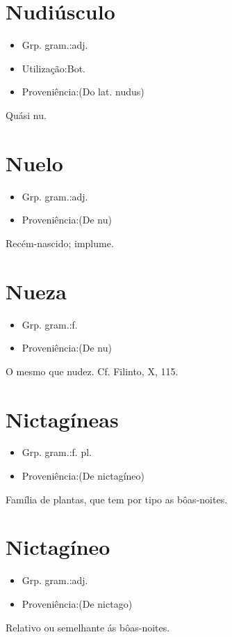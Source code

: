 \section{Nudiúsculo}
\begin{itemize}
\item {Grp. gram.:adj.}
\end{itemize}
\begin{itemize}
\item {Utilização:Bot.}
\end{itemize}
\begin{itemize}
\item {Proveniência:(Do lat. \textunderscore nudus\textunderscore )}
\end{itemize}
Quási nu.
\section{Nuelo}
\begin{itemize}
\item {Grp. gram.:adj.}
\end{itemize}
\begin{itemize}
\item {Proveniência:(De \textunderscore nu\textunderscore )}
\end{itemize}
Recém-nascido; implume.
\section{Nueza}
\begin{itemize}
\item {Grp. gram.:f.}
\end{itemize}
\begin{itemize}
\item {Proveniência:(De \textunderscore nu\textunderscore )}
\end{itemize}
O mesmo que nudez. Cf. Filinto, X, 115.
\section{Nictagíneas}
\begin{itemize}
\item {Grp. gram.:f. pl.}
\end{itemize}
\begin{itemize}
\item {Proveniência:(De \textunderscore nictagíneo\textunderscore )}
\end{itemize}
Família de plantas, que tem por tipo as bôas-noites.
\section{Nictagíneo}
\begin{itemize}
\item {Grp. gram.:adj.}
\end{itemize}
\begin{itemize}
\item {Proveniência:(De \textunderscore nictago\textunderscore )}
\end{itemize}
Relativo ou semelhante ás bôas-noites.
